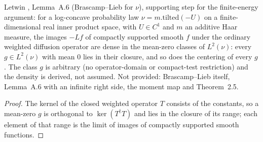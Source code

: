 \begin{lemma}
  \label{lem:letwin-centered-range}
  \leanok
  Letwin \cite{Letwin2026QuadraticKLS}, Lemma~A.6 (Brascamp--Lieb for $\nu$), supporting step for the finite-energy
  argument: for a log-concave probability law $\nu=m.\mathrm{tilted}(-U)$ on a finite-dimensional real inner product space,
  with $U\in C^1$ and $m$ an additive Haar measure, the images $-Lf$ of compactly supported smooth $f$ under the ordinary
  weighted diffusion operator are dense in the mean-zero classes of $L^2(\nu)$: every $g\in L^2(\nu)$ with mean $0$ lies in
  their closure, and so does the centering of every $g$.  The class $g$ is arbitrary (no operator-domain or compact-test
  restriction) and the density is derived, not assumed.  Not provided: Brascamp--Lieb itself, Lemma~A.6 with an infinite
  right side, the moment map and Theorem~2.5.
\end{lemma}
\begin{proof}
  \leanok
  The kernel of the closed weighted operator $T$ consists of the constants, so a mean-zero $g$ is orthogonal to
  $\ker(T^{\dagger}T)$ and lies in the closure of its range; each element of that range is the limit of images of compactly
  supported smooth functions.
\end{proof}

